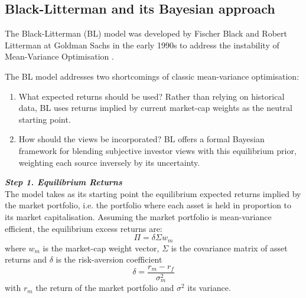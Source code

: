 \documentclass[a4paper,alpha-refs]{scr-contemporary}
\numberwithin{equation}{section}
\begin{document}
\subsection{Black-Litterman and its Bayesian approach}

\indent \indent The Black-Litterman (BL) model was developed by Fischer Black and 
Robert Litterman at Goldman Sachs in the early 1990s 
to address the instability of Mean-Variance Optimisation \citep{black_asset_1991, black_global_1992}.

\indent The BL model addresses two shortcomings of classic mean-variance optimisation:
\begin{enumerate}
  \vspace{-2mm}
  \item What expected returns should be used? \newline
  Rather than relying on historical data, BL uses returns implied by current 
  market-cap weights as the neutral starting point.
  \item How should the views be incorporated? \newline
  BL offers a formal Bayesian framework for blending subjective investor views 
  with this equilibrium prior, weighting each source inversely by its uncertainty.
  \vspace{-2mm}
\end{enumerate}

\noindent \textbf{\emph{Step 1. Equilibrium Returns}} \\
\indent The model takes as its starting point the equilibrium expected returns implied 
by the market portfolio, i.e. the portfolio where each asset is held in proportion
to its market capitalisation.
Assuming the market portfolio is mean-variance efficient, the equilibrium excess returns are:
\begin{equation}
\Pi = \delta \Sigma w_{m}
\end{equation}
where $w_m$ is the market-cap weight vector, $\Sigma$ is the covariance 
matrix of asset returns and $\delta$ is the risk-aversion coefficient
\begin{equation}
  \delta = \frac{r_m - r_f}{\sigma_m^2}
\end{equation}
with $r_m$ the return of the market portfolio and $\sigma^2$ its variance. \\
\end{document}

